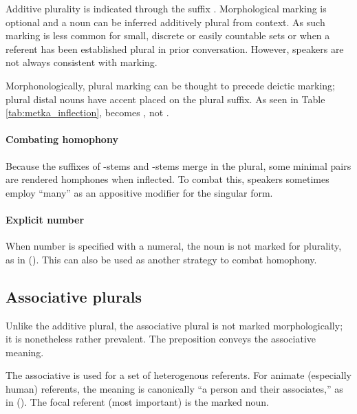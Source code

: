 Additive plurality is indicated through the suffix . Morphological marking is optional and a noun can be inferred additively plural from context.  As such marking is less common for small, discrete or easily countable sets or when a referent has been established plural in prior conversation. However, speakers are not always consistent with marking.

Morphonologically, plural marking can be thought to precede deictic marking; plural distal nouns have accent placed on the plural suffix. As seen in Table \ref{tab:metka_inflection},  becomes , not .

\paragraph{Combating homophony}
Because the suffixes of -stems and -stems merge in the plural, some minimal pairs are rendered homphones when inflected. To combat this, speakers sometimes employ  “many” as an appositive modifier for the singular form.

\paragraph{Explicit number}
When number is specified with a numeral, the noun is not marked for plurality, as in (\nextx). This can also be used as another strategy to combat homophony.


\subsection{Associative plurals}
Unlike the additive plural, the associative plural is not marked morphologically; it is nonetheless rather prevalent. The preposition  conveys the associative meaning.

The associative is used for a set of heterogenous referents. For animate (especially human) referents, the meaning is canonically “a person and their associates,” as in (\nextx). The focal referent (\ie most important) is the marked noun.

